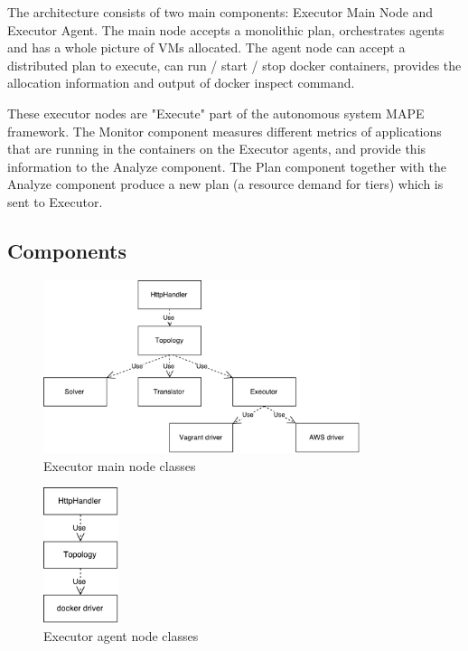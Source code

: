 The architecture consists of two main components: Executor Main Node and Executor Agent. The main node accepts a monolithic plan, orchestrates agents 
and has a whole picture of VMs allocated. The agent node can accept a distributed plan to execute, can run / start / stop docker containers, provides the allocation information and output of docker inspect command.

These executor nodes are "Execute" part of the autonomous system MAPE framework. The Monitor component measures different metrics of applications that are
running in the containers on the Executor agents, and provide this information to the Analyze component. The Plan component together with the Analyze component produce a new plan (a resource demand for tiers) which is sent to Executor.

\clearpage
\subsection{Components}
\begin{figure}[ht]
  \centering
    \includegraphics[width=350px,natwidth=553,natheight=303]{./pictures/main-classes}
    \caption{Executor main node classes}
\end{figure}

\begin{figure}[ht]
  \centering
    \includegraphics[height=150px,natwidth=113,natheight=203]{./pictures/agent-classes}
    \caption{Executor agent node classes}
\end{figure}